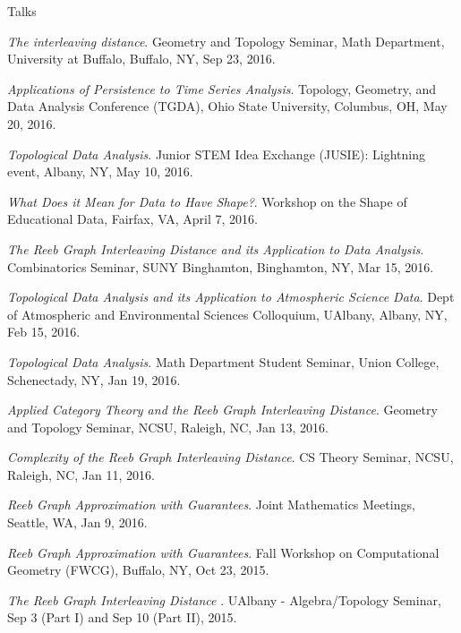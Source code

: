 \documentclass{resume} %
\begin{document}
\begin{rSection}{Talks}
\begin{etaremune}
\item\emph{The interleaving distance}. Geometry and Topology Seminar, Math Department, University at Buffalo, Buffalo, NY, Sep 23, 2016. 

\item\emph{Applications of Persistence to Time Series Analysis}. Topology, Geometry, and Data Analysis Conference (TGDA), Ohio State University, Columbus, OH, May 20, 2016. 

\item\emph{Topological Data Analysis}. Junior STEM Idea Exchange (JUSIE): Lightning event, Albany, NY, May 10, 2016. 

\item\emph{What Does it Mean for Data to Have Shape?}. Workshop on the Shape of Educational Data, Fairfax, VA, April 7, 2016. 

\item\emph{The Reeb Graph Interleaving Distance and its Application to Data Analysis}. Combinatorics Seminar, SUNY Binghamton, Binghamton, NY, Mar 15, 2016. 

\item\emph{Topological Data Analysis and its Application to Atmospheric Science Data}. Dept of Atmospheric and Environmental Sciences Colloquium, UAlbany, Albany, NY, Feb 15, 2016. 

\item\emph{Topological Data Analysis}. Math Department Student Seminar, Union College, Schenectady, NY, Jan 19, 2016. 

\item\emph{Applied Category Theory and the Reeb Graph Interleaving Distance}. Geometry and Topology Seminar, NCSU, Raleigh, NC, Jan 13, 2016. 

\item\emph{Complexity of the Reeb Graph Interleaving Distance}. CS Theory Seminar, NCSU, Raleigh, NC, Jan 11, 2016. 

\item\emph{Reeb Graph Approximation with Guarantees}. Joint Mathematics Meetings, Seattle, WA, Jan 9, 2016. 

\item\emph{Reeb Graph Approximation with Guarantees}. Fall Workshop on Computational Geometry (FWCG), Buffalo, NY, Oct 23, 2015. 

\item\emph{The Reeb Graph Interleaving Distance }. UAlbany - Algebra/Topology Seminar, Sep 3 (Part I) and Sep 10 (Part II), 2015. 


\end{etaremune}
\end{rSection}
\end{document}
